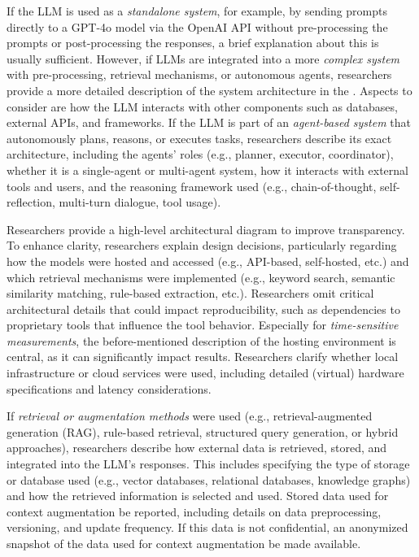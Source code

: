 If the LLM is used as a \emph{standalone system}, for example, by sending prompts directly to a GPT-4o model via the OpenAI API without pre-processing the prompts or post-processing the responses, a brief explanation about this is usually sufficient.
However, if LLMs are integrated into a more \emph{complex system} with pre-processing, retrieval mechanisms, or autonomous agents, researchers \must provide a more detailed description of the system architecture in the \paper.
Aspects to consider are how the LLM interacts with other components such as databases, external APIs, and frameworks.
If the LLM is part of an \emph{agent-based system} that autonomously plans, reasons, or executes tasks, researchers \must describe its exact architecture, including the agents' roles (e.g., planner, executor, coordinator), whether it is a single-agent or multi-agent system, how it interacts with external tools and users, and the reasoning framework used (e.g., chain-of-thought, self-reflection, multi-turn dialogue, tool usage).

Researchers \should provide a high-level architectural diagram to improve transparency.
To enhance clarity, researchers \should explain design decisions, particularly regarding how the models were hosted and accessed (e.g., API-based, self-hosted, etc.) and which retrieval mechanisms were implemented (e.g., keyword search, semantic similarity matching, rule-based extraction, etc.).
Researchers \mustnot omit critical architectural details that could impact reproducibility, such as dependencies to proprietary tools that influence the tool behavior. 
Especially for \emph{time-sensitive measurements}, the before-mentioned description of the hosting environment is central, as it can significantly impact results.
Researchers \must clarify whether local infrastructure or cloud services were used, including detailed (virtual) hardware specifications and latency considerations.

If \emph{retrieval or augmentation methods} were used (e.g., retrieval-augmented generation (RAG), rule-based retrieval, structured query generation, or hybrid approaches), researchers \must describe how external data is retrieved, stored, and integrated into the LLM's responses.
This includes specifying the type of storage or database used (e.g., vector databases, relational databases, knowledge graphs) and how the retrieved information is selected and used.
Stored data used for context augmentation \must be reported, including details on data preprocessing, versioning, and update frequency.
If this data is not confidential, an anonymized snapshot of the data used for context augmentation \should be made available.


